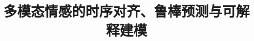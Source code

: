 \documentclass{gmcmthesis}
\title{多模态情感的时序对齐、鲁棒预测与可解释建模}
\begin{document}
\makecover
\maketitle
\begin{abstract}
  
\end{abstract}

\startbody








\end{document}

